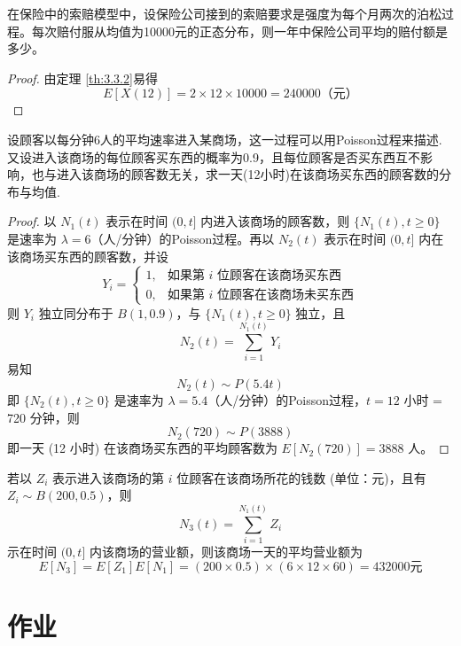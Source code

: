 \documentclass[lang=cn,10pt,thmcnt=section]{elegantbook}
\begin{document}
\begin{example}
	在保险中的索赔模型中，设保险公司接到的索赔要求是强度为每个月两次的泊松过程。每次赔付服从均值为10000元的正态分布，则一年中保险公司平均的赔付额是多少。
\end{example}
\begin{proof}
	由定理 \ref{th:3.3.2}易得
\[
E[X(12)] = 2 \times 12 \times 10000 = 240000 \text{（元）}
\]

\end{proof}
\begin{example}
	设顾客以每分钟6人的平均速率进入某商场，这一过程可以用Poisson过程来描述. 又设进入该商场的每位顾客买东西的概率为0.9，且每位顾客是否买东西互不影响，也与进入该商场的顾客数无关，求一天(12小时)在该商场买东西的顾客数的分布与均值.
\end{example}
\begin{proof}
	以 $N_1(t)$ 表示在时间 $(0, t]$ 内进入该商场的顾客数，则 $\{N_1(t), t \geq 0\}$ 是速率为 $\lambda = 6$（人/分钟）的Poisson过程。再以 $N_2(t)$ 表示在时间 $(0, t]$ 内在该商场买东西的顾客数，并设
	\[
	Y_i = 
	\begin{cases} 
	1, & \text{如果第 } i \text{ 位顾客在该商场买东西} \\
	0, & \text{如果第 } i \text{ 位顾客在该商场未买东西}
	\end{cases}
	\]
	则 $Y_i$ 独立同分布于 $B(1, 0.9)$，与 $\{N_1(t), t \geq 0\}$ 独立，且
	\[
	N_2(t) = \sum_{i=1}^{N_1(t)} Y_i
	\]
	易知
	\[
	N_2(t) \sim P(5.4t)
	\]
	即 $\{N_2(t), t \geq 0\}$ 是速率为 $\lambda = 5.4$（人/分钟）的Poisson过程，$t = 12$ 小时 = 720 分钟，则
	\[
	N_2(720) \sim P(3888)
	\]
	即一天 (12 小时) 在该商场买东西的平均顾客数为 $E[N_2(720)] = 3888$ 人。
	
	
	
\end{proof}
\begin{remark}
	 若以 $Z_i$ 表示进入该商场的第 $i$ 位顾客在该商场所花的钱数 (单位：元)，且有 $Z_i \sim B(200, 0.5)$，则
	\[
	N_3(t) = \sum_{i=1}^{N_1(t)} Z_i
	\]
	示在时间 $(0, t]$ 内该商场的营业额，则该商场一天的平均营业额为
	\[
	E[N_3] = E[Z_1] E[N_1] = (200 \times 0.5) \times (6 \times 12 \times 60) = 432000 \text{元}
	\]
\end{remark}
\section{作业}
\end{document}
